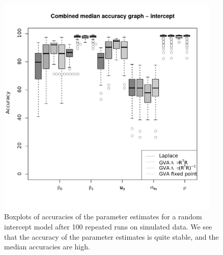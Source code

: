 \begin{figure}[h]
	\begin{center}
		\includegraphics[width=0.95\textwidth]{code/results/median_accuracy_combined_intercept.pdf}
		\caption{Boxplots of accuracies of the parameter estimates for a random intercept model after 100 repeated
							runs on simulated data. We see that the accuracy of the parameter estimates is quite stable,
							and the median accuracies are high.}
		\label{fig:median_accuracy_intercept}
	\end{center}
\end{figure}
		
